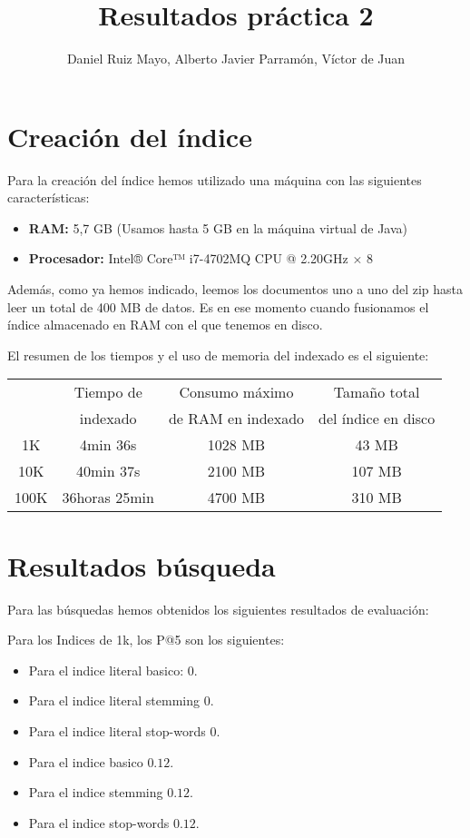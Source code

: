 \documentclass[palatino,nochap]{apuntes}
\title{Resultados práctica 2}
\author{Daniel Ruiz Mayo, Alberto Javier Parramón, Víctor de Juan}
\date{}
\begin{document}
\pagestyle{plain}
\maketitle



\section{Creación del índice}
Para la creación del índice hemos utilizado una máquina con las siguientes características:

\begin{itemize}
	\item \textbf{RAM: }5,7 GB (Usamos hasta 5 GB en la máquina virtual de Java)
	\item \textbf{Procesador: } Intel® Core™ i7-4702MQ CPU @ 2.20GHz × 8 
\end{itemize}

Además, como ya hemos indicado, leemos los documentos uno a uno del zip hasta leer un total de 400 MB de datos. Es en ese momento cuando fusionamos el índice almacenado en RAM con el que tenemos en disco.

El resumen de los tiempos y el uso de memoria del indexado es el siguiente:



\begin{tabular}{|c|c|c|c|}
	\hline
	 & Tiempo de & Consumo máximo & Tamaño total \\
	 & indexado & de RAM en indexado & del índice en disco  \\
	\hline
	1K & 4min 36s & 1028 MB  & 43 MB \\
	\hline
	10K & 40min 37s & 2100 MB & 107 MB \\
	\hline
	100K & 36horas 25min &  4700 MB  & 310 MB\\
	\hline
\end{tabular}


\newpage
\section{Resultados búsqueda}
Para las búsquedas hemos obtenidos los siguientes resultados de evaluación:

Para los Indices de 1k, los P@5 son los siguientes:
\begin{itemize}
\item Para el indice literal basico: $0$.
\item Para el indice literal stemming $0$.
\item Para el indice literal stop-words $0$.
\item Para el indice basico $0.12$.
\item Para el indice stemming $0.12$.
\item Para el indice stop-words $0.12$.
\end{itemize}
\end{document}
